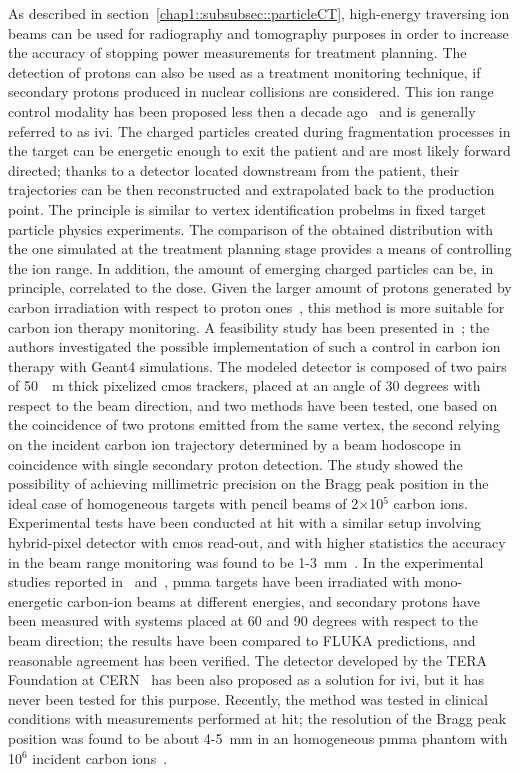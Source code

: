 As described in section~\ref{chap1::subsubsec::particleCT}, high-energy traversing ion beams can be used for radiography and tomography purposes in order to increase the accuracy of stopping power measurements for treatment planning. The detection of protons can also be used as a treatment monitoring technique, if secondary protons produced in nuclear collisions are considered. This ion range control modality has been proposed less then a decade ago~\parencite{Dauvergne2009, Amaldi2010b} and is generally referred to as \gls{ivi}. The charged particles created during fragmentation processes in the target can be energetic enough to exit the patient and are most likely forward directed; thanks to a detector located downstream from the patient, their trajectories can be then reconstructed and extrapolated back to the production point. The principle is similar to vertex identification probelms in fixed target particle physics experiments. The comparison of the obtained distribution with the one simulated at the treatment planning stage provides a means of controlling the ion range. In addition, the amount of emerging charged particles can be, in principle, correlated to the dose. Given the larger amount of protons generated by carbon irradiation with respect to proton ones~\parencite{Gunzert-Marx2008}, this method is more suitable for carbon ion therapy monitoring.  
A feasibility study has been presented in~\cite{Henriquet2012}; the authors investigated the possible implementation of such a control in carbon ion therapy with Geant4 simulations. The modeled detector is composed of two pairs of 50~\charmu ~m thick pixelized \gls{cmos} trackers, placed at an angle of 30 degrees with respect to the beam direction, and two methods have been tested, one based on the coincidence of two protons emitted from the same vertex, the second relying on the incident carbon ion trajectory determined by a beam hodoscope in coincidence with single secondary proton detection. The study showed the possibility of achieving millimetric precision on the Bragg peak position in the ideal case of homogeneous targets with pencil beams of 2$\times$10$^5$ carbon ions. Experimental tests have been conducted at \gls{hit} with a similar setup involving hybrid-pixel detector with \gls{cmos} read-out, and with higher statistics the accuracy in the beam range monitoring was found to be 1-3~mm~\parencite{Gwosch2013}. In the experimental studies reported in~\cite{Agodi2012} and~\cite{Piersanti2014}, \gls{pmma} targets have been irradiated with mono-energetic carbon-ion beams at different energies, and secondary protons have been measured with systems placed at 60 and 90 degrees with respect to the beam direction; the results have been compared to FLUKA predictions, and reasonable agreement has been verified. The detector developed by the TERA Foundation at CERN~\parencite{BucciantonioPhD2015} has been also proposed as a solution for \gls{ivi}, but it has never been tested for this purpose. Recently, the method was tested in clinical conditions with measurements performed at \gls{hit}; the resolution of the Bragg peak position was found to be about 4-5~mm in an homogeneous \gls{pmma} phantom with 10$^6$ incident carbon ions~\parencite{Finck2017}.
